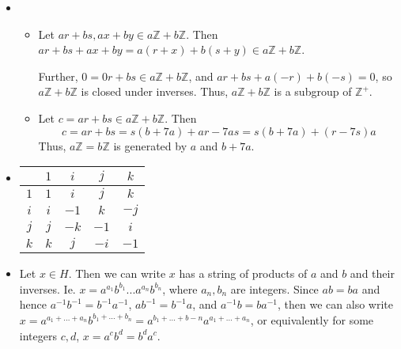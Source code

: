 \documentclass[12pt]{article}
\begin{document}
\begin{itemize}
\begin{itemize}
$$\begin{bmatrix}
& 1
\end{bmatrix} \right\rbrace, \left\lbrace \begin{bmatrix}
\pm 1 & \\
& \pm 1
\end{bmatrix} \right\rbrace, \left\lbrace \begin{bmatrix}
1 & \\
& 1
\end{bmatrix}, \begin{bmatrix}
-1 & \\
& -1
\end{bmatrix} \right\rbrace$$
$$\left\lbrace \begin{bmatrix}
\pm 1 & \\
& 1
\end{bmatrix} \right\rbrace, \left\lbrace \begin{bmatrix}
1 & \\
& \pm 1
\end{bmatrix} \right\rbrace$$
\end{itemize}
\item[(7)]
\begin{itemize}
\item[(a)]
Let $ar + bs, ax + by \in a\mathbb{Z} + b\mathbb{Z}$. Then $ar + bs + ax + by = a(r + x) + b(s + y) \in a\mathbb{Z} + b\mathbb{Z}$.

Further, $0 = 0r + bs \in a\mathbb{Z} + b\mathbb{Z}$, and $ar + bs + a(-r) + b(-s) = 0$, so $a\mathbb{Z} + b\mathbb{Z}$ is closed under inverses. Thus, $a\mathbb{Z} + b\mathbb{Z}$ is a subgroup of $\mathbb{Z}^+$.
\item[(b)]
Let $c = ar + bs \in a\mathbb{Z} + b\mathbb{Z}$. Then 
$$c = ar + bs = s(b + 7a) + ar - 7as = s(b + 7a) + (r - 7s)a$$
Thus, $a\mathbb{Z} = b\mathbb{Z}$ is generated by $a$ and $b + 7a$.
\end{itemize}
\item[(8)]
\begin{tabular}{|c||c|c|c|c|}
\hline
& $1$ & $i$ & $j$ & $k$ \\
\hline
\hline
$1$ & $1$ & $i$ & $j$ & $k$ \\
\hline
$i$ & $i$ & $-1$ & $k$ & $-j$ \\
\hline
$j$ & $j$ & $-k$ & $-1$ & $i$ \\
\hline
$k$ & $k$ & $j$ & $-i$ & $-1$ \\
\hline
\end{tabular}
\item[(9)]
Let $x \in H$. Then we can write $x$ has a string of products of $a$ and $b$ and their inverses. Ie. $x = a^{a_1}b^{b_1}...a^{a_n}b^{b_n}$, where $a_n, b_n$ are integers. Since $ab = ba$ and hence $a^{-1}b^{-1} = b^{-1}a^{-1}$, $ab^{-1} = b^{-1}a$, and $a^{-1}b = ba^{-1}$, then we can also write $x = a^{a_1+...+a_n}b^{b_1+...+b_n} = a^{b_1 + ... + b-n}a^{a_1+...+a_n}$, or equivalently for some integers $c, d$, $x = a^cb^d = b^da^c$. 


\end{itemize}
\end{document}
